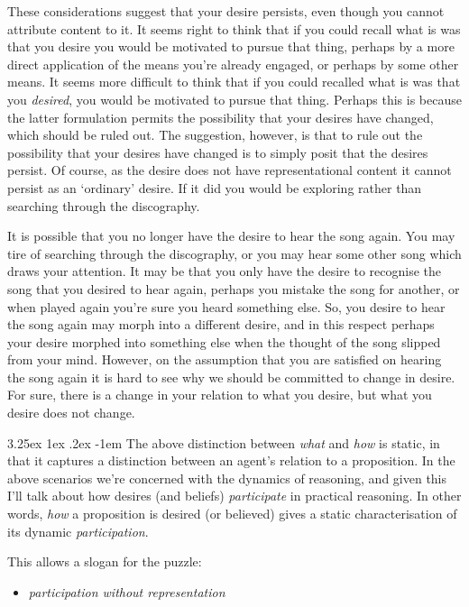 \documentclass[10pt]{article}
\makeatletter
\newcommand{\hand}{\ding{43}}
\renewcommand\paragraph{\@startsection{paragraph}{5}{\z@}%
  {3.25ex \@plus1ex \@minus.2ex}%
  {-1em}%
  {\normalfont\normalsize\bfseries}}
\makeatother
\begin{document}
These considerations suggest that your desire persists, even though you cannot attribute content to it.
It seems right to think that if you could recall what is was that you desire you would be motivated to pursue that thing, perhaps by a more direct application of the means you're already engaged, or perhaps by some other means.
It seems more difficult to think that if you could recalled what is was that you \emph{desired}, you would be motivated to pursue that thing.
Perhaps this is because the latter formulation permits the possibility that your desires have changed, which should be ruled out.
The suggestion, however, is that to rule out the possibility that your desires have changed is to simply posit that the desires persist.
Of course, as the desire does not have representational content it cannot persist as an `ordinary' desire.
If it did you would be exploring rather than searching through the discography.

It is possible that you no longer have the desire to hear the song again.
You may tire of searching through the discography, or you may hear some other song which draws your attention.
It may be that you only have the desire to recognise the song that you desired to hear again, perhaps you mistake the song for another, or when played again you're sure you heard something else.
So, you desire to hear the song again may morph into a different desire, and in this respect perhaps your desire morphed into something else when the thought of the song slipped from your mind.
However, on the assumption that you are satisfied on hearing the song again it is hard to see why we should be committed to change in desire.
For sure, there is a change in your relation to what you desire, but what you desire does not change.

\paragraph{ }
The above distinction between \emph{what} and \emph{how} is static, in that it captures a distinction between an agent's relation to a proposition.
In the above scenarios we're concerned with the dynamics of reasoning, and given this I'll talk about how desires (and beliefs) \emph{participate} in practical reasoning.
In other words, \emph{how} a proposition is desired (or believed) gives a static characterisation of its dynamic \emph{participation}.

This allows a slogan for the puzzle:
\begin{itemize}
\item[\hand] \emph{participation without representation}
\end{itemize}
\end{document}
